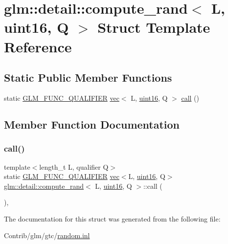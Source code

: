 \hypertarget{structglm_1_1detail_1_1compute__rand_3_01_l_00_01uint16_00_01_q_01_4}{}\section{glm\+:\+:detail\+:\+:compute\+\_\+rand$<$ L, uint16, Q $>$ Struct Template Reference}
\label{structglm_1_1detail_1_1compute__rand_3_01_l_00_01uint16_00_01_q_01_4}
\subsection*{Static Public Member Functions}
\begin{DoxyCompactItemize}
\item 
static \mbox{\hyperlink{setup_8hpp_a33fdea6f91c5f834105f7415e2a64407}{G\+L\+M\+\_\+\+F\+U\+N\+C\+\_\+\+Q\+U\+A\+L\+I\+F\+I\+ER}} \mbox{\hyperlink{structglm_1_1vec}{vec}}$<$ L, \mbox{\hyperlink{namespaceglm_1_1detail_a47b2a7d006d187338e8031a352d1ce56}{uint16}}, Q $>$ \mbox{\hyperlink{structglm_1_1detail_1_1compute__rand_3_01_l_00_01uint16_00_01_q_01_4_a3fd5ddfdeccd559f68aecf1e8074d24b}{call}} ()
\end{DoxyCompactItemize}


\subsection{Member Function Documentation}
\mbox{\label{structglm_1_1detail_1_1compute__rand_3_01_l_00_01uint16_00_01_q_01_4_a3fd5ddfdeccd559f68aecf1e8074d24b}} 
\subsubsection{\texorpdfstring{call()}{call()}}
{\footnotesize\ttfamily template$<$length\+\_\+t L, qualifier Q$>$ \\
static \mbox{\hyperlink{setup_8hpp_a33fdea6f91c5f834105f7415e2a64407}{G\+L\+M\+\_\+\+F\+U\+N\+C\+\_\+\+Q\+U\+A\+L\+I\+F\+I\+ER}} \mbox{\hyperlink{structglm_1_1vec}{vec}}$<$L, \mbox{\hyperlink{namespaceglm_1_1detail_a47b2a7d006d187338e8031a352d1ce56}{uint16}}, Q$>$ \mbox{\hyperlink{structglm_1_1detail_1_1compute__rand}{glm\+::detail\+::compute\+\_\+rand}}$<$ L, \mbox{\hyperlink{namespaceglm_1_1detail_a47b2a7d006d187338e8031a352d1ce56}{uint16}}, Q $>$\+::call (\begin{DoxyParamCaption}{ }\end{DoxyParamCaption})\hspace{0.3cm}{\ttfamily [inline]}, {\ttfamily [static]}}



The documentation for this struct was generated from the following file\+:\begin{DoxyCompactItemize}
\item 
Contrib/glm/gtc/\mbox{\hyperlink{random_8inl}{random.\+inl}}\end{DoxyCompactItemize}
